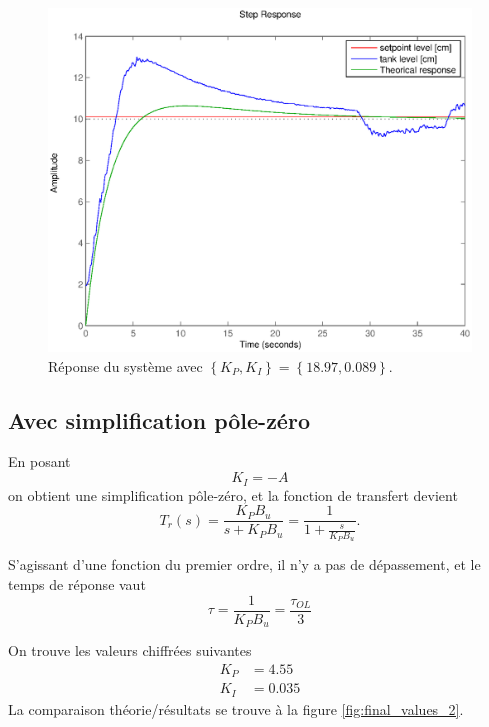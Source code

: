 \documentclass[frenchb, paper=a4, fontsize=11pt]{scrartcl}
\numberwithin{equation}{section}					%
\numberwithin{figure}{section}					%
\numberwithin{table}{section}						%
\begin{document}
\begin{figure}[!ht]
	\centering
	\includegraphics[width=0.8\linewidth]{img/cl_ultimate_without_simplification.eps}
	\caption{Réponse du système avec $\left\{K_P,K_I \right \} = \left\{18.97,0.089\right\}$.}
	\label{fig:final_values_1}
\end{figure}

\subsection{Avec simplification pôle-zéro}
En posant 
\begin{equation}
	K_I = -A
\end{equation}
on obtient une simplification pôle-zéro, et la fonction de transfert devient
\begin{equation}
	T_r(s) = \frac{K_P B_u}{s+K_P B_u}= \frac{1}{1+\frac{s}{K_P B_u}}.
\end{equation}

S'agissant d'une fonction du premier ordre, il n'y a pas de dépassement, et le temps de réponse vaut 
\begin{equation}
	\tau = \frac{1}{K_P B_u} = \frac{\tau_{OL}}{3} 
\end{equation}

On trouve les valeurs chiffrées suivantes
\begin{align}
	K_P &= 4.55\\
	K_I &= 0.035
\end{align}
La comparaison théorie/résultats se trouve à la figure \ref{fig:final_values_2}.
\end{document}
